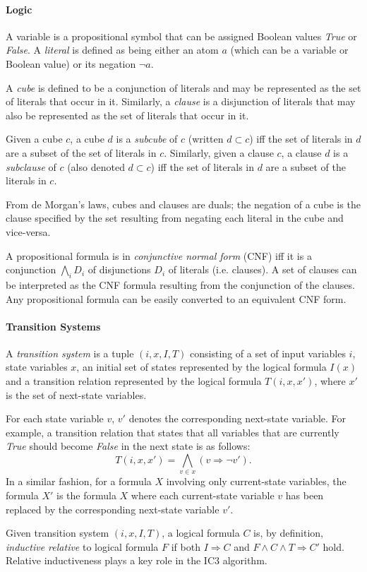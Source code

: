 \documentclass[12pt,a4paper,twoside,openright]{report}
\begin{document}
\paragraph{Logic}{
A variable is a propositional symbol that can be assigned Boolean values {\it True}
or {\it False}. A \emph{literal} is defined as being either an atom $a$ (which can
be a variable or Boolean value) or its negation $\neg a$.

A \emph{cube} is defined to be a conjunction of literals and may be represented as the set
of literals that occur in it. Similarly, a \emph{clause} is a disjunction of literals that
may also be represented as the set of literals that occur in it.

Given a cube $c$, a cube $d$ is a \emph{subcube} of $c$ (written $d \subset c$)
iff the set of literals in $d$ are a subset of the set of literals in $c$.
Similarly, given a clause $c$, a clause $d$ is a \emph{subclause} of $c$ (also
denoted $d \subset c$) iff the set of literals in $d$ are a subset of
the literals in $c$.

From de Morgan's laws, cubes and clauses are duals; the negation of a cube is the
clause specified by the set resulting from negating each literal in the cube
and vice-versa.

A propositional formula is in \emph{conjunctive normal form} (CNF) iff it is a conjunction 
$\bigwedge_i D_i$ of disjunctions $D_i$ of literals (i.e. clauses). A set of clauses
can be interpreted as the CNF formula resulting from the conjunction
of the clauses. Any propositional formula can be easily converted to an equivalent CNF
form.}

\paragraph{Transition Systems}{
A \emph{transition system} is a tuple $(i,x,I,T)$ consisting of a set of input
variables $i$, state variables $x$, an initial
set of states represented by the logical formula $I(x)$ and
a transition relation represented by the logical formula $T(i,x,x')$,
where $x'$ is the set of next-state variables.

For each state variable $v$, $v'$ denotes the corresponding next-state variable.
For example, a transition relation that states that all variables that are
currently {\it True} should become {\it False} in the next state is as follows:
$$T(i,x,x') = \bigwedge_{v \in x} (v \Rightarrow \neg v').$$
In a similar fashion, for a formula $X$ involving only current-state variables,
the formula $X'$ is the formula $X$ where each current-state variable $v$ has
been replaced by the corresponding next-state variable $v'$.

Given transition system $(i,x,I,T)$, a logical formula $C$ is, by definition,
\emph{inductive relative} to logical formula $F$ if both
$I \Rightarrow C$ and $F \wedge C \wedge T \Rightarrow C'$ hold.
Relative inductiveness plays a key role in the IC3 algorithm.
}
\end{document}
